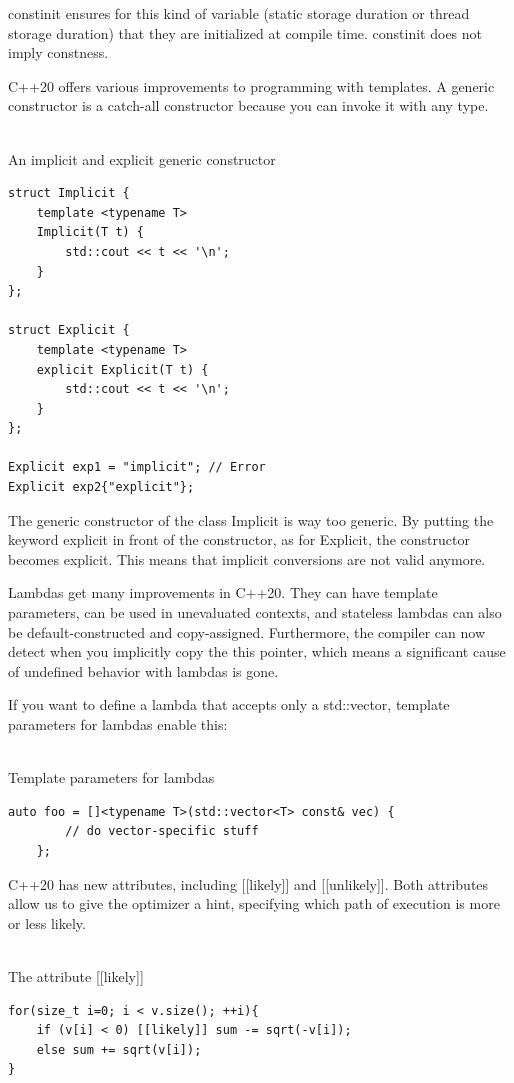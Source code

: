 constinit ensures for this kind of variable (static storage duration or thread storage duration) that they are initialized at compile time. constinit does not imply constness.


C++20 offers various improvements to programming with templates. A generic constructor is a catch-all constructor because you can invoke it with any type.

\hspace*{\fill} \\ %
\noindent
An implicit and explicit generic constructor
\begin{lstlisting}[style=styleCXX]
struct Implicit {
	template <typename T>
	Implicit(T t) {
		std::cout << t << '\n';
	}
};

struct Explicit {
	template <typename T>
	explicit Explicit(T t) {
		std::cout << t << '\n';
	}
};

Explicit exp1 = "implicit"; // Error
Explicit exp2{"explicit"};
\end{lstlisting}

The generic constructor of the class Implicit is way too generic. By putting the keyword explicit in front of the constructor, as for Explicit, the constructor becomes explicit. This means that implicit conversions are not valid anymore.


Lambdas get many improvements in C++20. They can have template parameters, can be used in unevaluated contexts, and stateless lambdas can also be default-constructed and copy-assigned. Furthermore, the compiler can now detect when you implicitly copy the this pointer, which means a significant cause of undefined behavior with lambdas is gone.

If you want to define a lambda that accepts only a std::vector, template parameters for lambdas enable this:

\hspace*{\fill} \\ %
\noindent
Template parameters for lambdas
\begin{lstlisting}[style=styleCXX]
auto foo = []<typename T>(std::vector<T> const& vec) {
		// do vector-specific stuff
	};
\end{lstlisting}


C++20 has new attributes, including [[likely]] and [[unlikely]]. Both attributes allow us to give the optimizer a hint, specifying which path of execution is more or less likely.

\hspace*{\fill} \\ %
\noindent
The attribute [[likely]]
\begin{lstlisting}[style=styleCXX]
for(size_t i=0; i < v.size(); ++i){
	if (v[i] < 0) [[likely]] sum -= sqrt(-v[i]);
	else sum += sqrt(v[i]);
}
\end{lstlisting}
